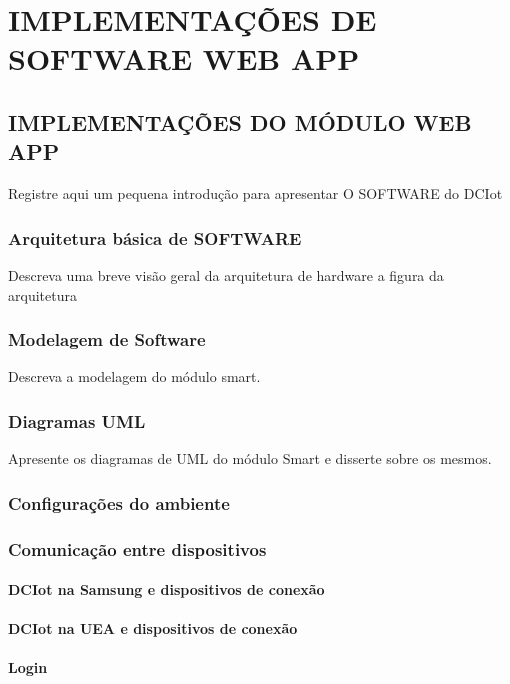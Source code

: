 \chapter{IMPLEMENTAÇÕES DE SOFTWARE WEB APP}


\section{IMPLEMENTAÇÕES DO MÓDULO WEB APP}
Registre aqui um pequena introdução para apresentar O SOFTWARE do DCIot
\subsection{Arquitetura básica de SOFTWARE}
Descreva uma breve visão geral da arquitetura de hardware a figura da arquitetura
\subsection{Modelagem de Software}
Descreva a modelagem do módulo smart.

\subsection{Diagramas UML }
Apresente os diagramas de UML do módulo Smart e disserte sobre os mesmos.


\subsection{Configurações do ambiente}

\subsection{Comunicação entre dispositivos}


\subsubsection{DCIot na Samsung e dispositivos de conexão}

\subsubsection{DCIot na UEA e dispositivos de conexão}

\subsubsection{Login}

